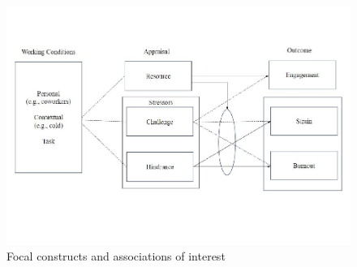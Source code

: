 \documentclass[
  man,mask]{apa7}
\begin{document}
\begin{figure}
\centering
\includegraphics{Submission_files/figure-latex/ourmodel-1.pdf}
\caption{\label{fig:ourmodel}Focal constructs and associations of interest}
\end{figure}
\end{document}
